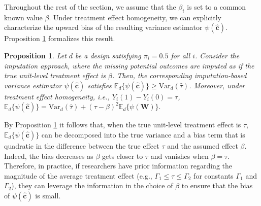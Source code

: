 \documentclass[12pt]{article}
\newcommand{\Var}{{\text{Var}}}
\newcommand{\E}{{\mathbb{E}}}
\newtheorem{proposition}[theorem]{Proposition}
\begin{document}
Throughout the rest of the section, we assume that the $\beta_i$ is set to a common known value $\beta$.
Under treatment effect homogeneity, we can explicitly characterize the upward bias of the resulting variance estimator $\psi(\hat{\bm{c}})$. Proposition \ref{thm_imputation1} formalizes this result.
\begin{proposition} \normalfont
    Let $d$ be a design satisfying $\pi_i = 0.5$ for all $i$. Consider the imputation approach, where the missing potential outcomes are imputed as if the true unit-level treatment effect is $\beta$. Then, the corresponding imputation-based variance estimator $\psi(\hat{\bm{c}})$
    satisfies $\E_d\{\psi(\hat{\bm{c}})\} \geq \Var_d(\hat{\tau})$. Moreover, under treatment effect homogeneity, i.e., $Y_i(1) - Y_i(0) = \tau$, $\E_d\{\psi(\hat{\bm{c}})\} = \Var_d(\hat{\tau}) + (\tau - \beta)^2\E_d\{\psi(\bm{W})\}.$
\label{thm_imputation1}
\end{proposition}
By Proposition \ref{thm_imputation1} it follows that, when the true unit-level treatment effect is $\tau$, $\E_d\{\psi(\hat{\bm{c}})\}$ can be decomposed into the true variance and a bias term that is quadratic in the difference between the true effect $\tau$ and the assumed effect $\beta$. Indeed, the bias decreases as $\beta$ gets closer to $\tau$ and vanishes when $\beta = \tau$. Therefore, in practice, if researchers have prior information regarding the magnitude of the average treatment effect (e.g., $\Gamma_1\leq \tau \leq \Gamma_2$ for constants $\Gamma_1$ and $\Gamma_2$), they can leverage the information in the choice of $\beta$ to ensure that the bias of $\psi(\hat{\bm{c}})$ is small. 
\end{document}
